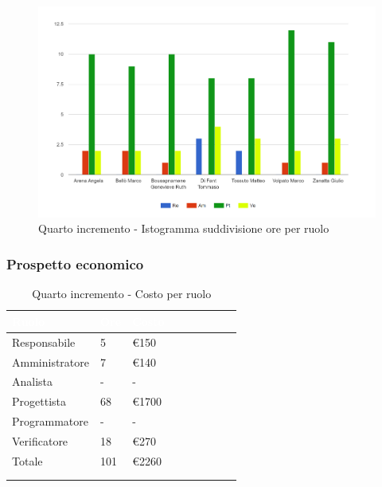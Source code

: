 {{      \begin{figure}[H]
        \includegraphics[width=15cm]{sezioni/images/quarto.png}
        \centering
        \caption{Quarto incremento - Istogramma suddivisione ore per ruolo}
     \end{figure}
    }

    \subsubsection{Prospetto economico}
    {
        \setlength{\freewidth}{\dimexpr\textwidth-30\tabcolsep}
        \renewcommand{\arraystretch}{1.0}
        \setlength{\aboverulesep}{0pt}
        \setlength{\belowrulesep}{0pt}
        \begin{longtable}{C{.4\freewidth} C{.2\freewidth} C{.2\freewidth} C{.2\freewidth} C{.2\freewidth} C{.2\freewidth} C{.2\freewidth} C{.2\freewidth} C{.2\freewidth}}
          \toprule
        \textcolor{white}{\textbf{Ruolo}}&
        \textcolor{white}{\textbf{Ore}}&
        \textcolor{white}{\textbf{Costo}}\\
        \toprule
        \endhead
            
        Responsabile  & 5 & \euro150\\
        Amministratore  & 7& \euro140 \\
        Analista &- & -\\
        Progettista &68 &\euro1700\\
        Programmatore &- & -\\
        Verificatore &18 &\euro270\\
        Totale&101&\euro2260\\
        \bottomrule
      \\
        \caption{Quarto incremento - Costo per ruolo}


\end{longtable}}}
